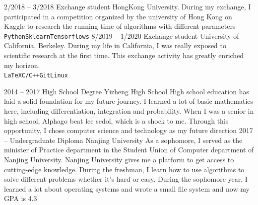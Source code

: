 \documentclass[9pt]{developercv} %
\begin{document}
\begin{center}
\end{center}



\begin{entrylist}
    \entry
    {2/2018 -- 3/2018}
    {Exchange student}
    {HongKong University.}
    {During my exchange, I participated in a competition organized by the university of Hong Kong on Kaggle to research the running time of algorithms with different parameters\\ \texttt{Python}\slashsep\texttt{Sklearn}\slashsep\texttt{Tensorflows}}
    \entry
    {8/2019 -- 1/2020}
    {Exchange student}
    {University of California, Berkeley.}
    {During my life in California, I was really exposed to scientific research at the first time. This exchange activity has greatly enriched my horizon.\\ \texttt{LaTeX}\slashsep\texttt{C/C++}\slashsep\texttt{Git}\slashsep\texttt{Linux}}
\end{entrylist}



\begin{entrylist}
    \entry
    {2014 -- 2017}
    {High School Degree}
    {Yizheng High School}
    {High school education has laid a solid foundation for my future journey. I learned a lot of basic mathematics here, including differentiation, integration and probability. When I was a senior in high school, Alphago beat lee sedol, which is a shock to me. Through this opportunity, I chose computer science and technology as my future direction}
    \entry
    {2017 -- }
    {Undergraduate Diploma}
    {Nanjing University}
    {As a sophomore, I served as the minister of Practice department in the Student Union of Computer department of Nanjing University. Nanjing University gives me a platform to get access to cutting-edge knowledge. During the freshman, I learn how to use algorithms to solve different problems whether it's hard or easy. During the sophomore year, I learned a lot about operating systems and wrote a small file system and now my GPA is 4.3}
\end{entrylist}
\end{document}
